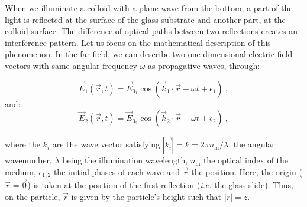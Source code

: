 When we illuminate a colloid with a plane wave from the bottom, a part of the light is reflected at the surface of the glass substrate and another part, at the colloid surface. The difference of optical paths between two reflections creates an interference pattern. Let us focus on the mathematical description of this phenomenon. In the far field, we can describe two one-dimensional electric field vectors with same angular frequency $\omega$ \cite{f_bohren_absorption_1998} as propagative waves, through:

\begin{equation}
	\vec{E}_1(\vec{r}, t) = \vec{E}_{0_1} \cos(\vec{k}_1 \cdot \vec{r} - \omega t + \epsilon_1) ~,
\end{equation}
and:
\begin{equation}
	\vec{E}_2(\vec{r}, t) = \vec{E}_{0_2} \cos (\vec{k}_2 \cdot \vec{r} - \omega t + \epsilon_2) ~,
\end{equation}



where the $k_i$ are the wave vector satisfying $|\vec{k_i}|=k =2\pi n_{\mathrm{m}}/\lambda$, the angular wavenumber, $\lambda$ being the illumination wavelength, $n_\mathrm{m}$ the optical index of the medium, $\epsilon_{1,2}$ the initial phases of each wave and $\vec{r}$ the position. Here, the origin ($\vec{r} = \vec{0}$) is taken at the position of the first reflection (\textit{i.e.} the glass slide). Thus, on the particle, $\vec{r}$ is given by the particle's height such that $|r| = z$. 

